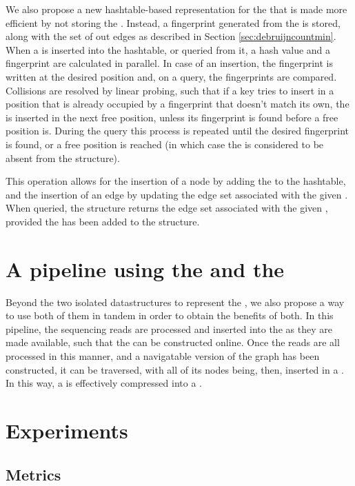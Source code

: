 We also propose a new hashtable-based representation for the \dBG that is made more efficient by not storing the \kmer. Instead,
a fingerprint generated from the \kmer is stored, along with the set of out edges as described in Section \ref{sec:debruijncountmin}.
When a \kmer is inserted into the hashtable, or queried from it, a hash value and a fingerprint are calculated in parallel.
In case of an insertion, the fingerprint is written at the desired position and, on a query, the fingerprints are compared. Collisions
are resolved by linear probing, such that if a key tries to insert in a position that is already occupied by a fingerprint that doesn't 
match its own, the \kmer is inserted in the next free position, unless its fingerprint is found before a free position is. During the
query this process is repeated until the desired fingerprint is found, or a free position is reached (in which case the \kmer is
considered to be absent from the structure).

This operation allows for the insertion of a node by adding the \kmer to the hashtable, and the insertion of an edge by updating the
edge set associated with the given \kmer. When queried, the structure returns the edge set associated with the given \kmer, provided
the \kmer has been added to the structure.

\section{A pipeline using the \dBCM and the \dBHT}


Beyond the two isolated datastructures to represent the \dBG, we also propose a way to use both of them in tandem in order to obtain
the benefits of both. In this pipeline, the sequencing reads are processed and inserted into the \dBCM as they are made available,
such that the \dBG can be constructed online. Once the reads are all processed in this manner, and a navigatable version of the graph 
has been constructed, it can be traversed, with all of its nodes being, then, inserted in a \dBHT. In this way, a \dBCM is effectively
compressed into a \dBHT.

\section{Experiments}

\subsection{Metrics}

